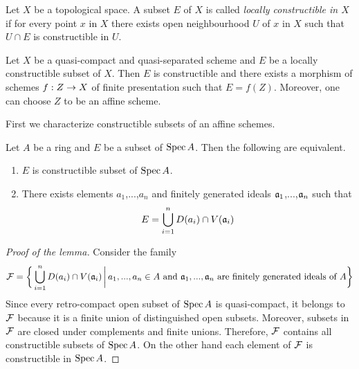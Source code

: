 \begin{definition}
Let $X$ be a topological space. A subset $E$ of $X$ is called \textit{locally constructible in $X$} if for every point $x$ in $X$ there exists open neighbourhood $U$ of $x$ in $X$ such that $U\cap E$ is constructible in $U$.
\end{definition}

\begin{theorem}\label{theorem:constructibleasimage}
Let $X$ be a quasi-compact and quasi-separated scheme and $E$ be a locally constructible subset of $X$. Then $E$ is constructible and there exists a morphism of schemes $f:Z\rightarrow X$ of finite presentation such that $E = f(Z)$. Moreover, one can choose $Z$ to be an affine scheme.
\end{theorem}
\noindent
First we characterize constructible subsets of an affine schemes.

\begin{lemma}\label{lemma:constructiblesubsetsofaffine}
Let $A$ be a ring and $E$ be a subset of $\mathrm{Spec}\, A$. Then the following are equivalent.
\begin{enumerate}[label=\emph{\textbf{(\roman*)}}, leftmargin=*]
\item $E$ is constructible subset of $\mathrm{Spec}\, A$.
\item There exists elements $a_1$,...,$a_n$ and finitely generated ideals $\mathfrak{a}_1$,...,$\mathfrak{a}_n$ such that
$$E = \bigcup_{i=1}^nD(a_i)\cap V(\mathfrak{a}_i)$$
\end{enumerate}
\end{lemma}
\begin{proof}[Proof of the lemma]
Consider the family 
$${\mathcal F} = \bigg\{\bigcup_{i=1}^nD(a_i)\cap V(\mathfrak{a}_i)\,\bigg|\,a_1,...,a_n\in A\mbox{ and }\mathfrak{a}_1,...,\mathfrak{a}_n\mbox{ are finitely generated ideals of }A\bigg\}$$
Since every retro-compact open subset of $\mathrm{Spec}\, A$ is quasi-compact, it belongs to ${\mathcal F}$ because it is a finite union of distinguished open subsets. Moreover, subsets in ${\mathcal F}$ are closed under complements and finite unions. Therefore, ${\mathcal F}$ contains all constructible subsets of $\mathrm{Spec}\, A$. On the other hand each element of ${\mathcal F}$ is constructible in $\mathrm{Spec}\, A$.
\end{proof}

